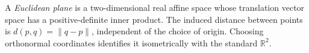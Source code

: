 
A \emph{Euclidean plane} is a two-dimensional real affine space whose translation vector space has a positive-definite inner product. The induced distance between points is $d(p,q)=\|q-p\|$, independent of the choice of origin. Choosing orthonormal coordinates identifies it isometrically with the standard $\mathbb R^2$.
